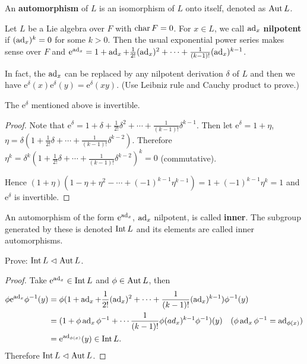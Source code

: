 \begin{definition}
    An \textbf{automorphism} of $L$ is an isomorphism of $L$ onto itself, denoted as $\operatorname{Aut} L$.
\end{definition}

\begin{definition}
    Let $L$ be a Lie algebra over $F$ with $\operatorname{char} F=0$. For $x\in L$, we call $\operatorname{ad}_x$ \textbf{nilpotent} if $(\operatorname{ad}_x)^k=0$ for some $k>0$. Then the usual exponential power series makes sense over $F$ and $\mathrm{e} ^{\operatorname{ad}_x}=1+\operatorname{ad}_x+\frac{1}{2!}(\operatorname{ad}_x)^2+ \cdots+\frac{1}{(k-1)!}(\operatorname{ad}_x)^{k-1}$.
\end{definition}
\begin{remark}
    In fact, the $\operatorname{ad}_x$ can be replaced by any nilpotent derivation $\delta$ of $L$ and then we have $\mathrm{e}^{\delta}(x) \mathrm{e}^{\delta}(y)=\mathrm{e}^{\delta}(xy)$. (Use Leibniz rule and Cauchy product to prove.)
\end{remark}

\begin{proposition}
    The $\mathrm{e}^{\delta}$ mentioned above is invertible.
\end{proposition}
\begin{proof}
    Note that $\mathrm{e}^{\delta}=1+\delta+\frac{1}{2!}\delta^2+ \cdots +\frac{1}{(k-1)!}\delta^{k-1}$. Then let $\mathrm{e}^{\delta}=1+\eta$, $\eta=\delta(1+\frac{1}{2!}\delta+ \cdots +\frac{1}{(k-1)!}\delta^{k-2})$. Therefore $\eta^k=\delta^k (1+\frac{1}{2!}\delta+ \cdots +\frac{1}{(k-1)!}\delta^{k-2})^k=0$ (commutative).

    Hence $(1+\eta)(1-\eta+\eta^2- \cdots +(-1)^{k-1}\eta^{k-1})=1+(-1)^{k-1}\eta^k=1$ and $\mathrm{e}^{\delta}$ is invertible.
\end{proof}

\begin{definition}
    An automorphism of the form $\mathrm{e}^{\operatorname{ad}_x}$, $\operatorname{ad}_x$ nilpotent, is called \textbf{inner}. The subgroup generated by these is denoted $\operatorname{Int} L$ and its elements are called inner automorphisms.
\end{definition}

\begin{proposition}
    Prove: $\operatorname{Int} L \vartriangleleft \operatorname{Aut} L$.
\end{proposition}
\begin{proof}
    Take $\mathrm{e}^{\operatorname{ad}_x} \in \operatorname{Int} L$ and $\phi \in \operatorname{Aut} L$, then 
    \begin{equation*}
        \begin{aligned}
        \phi \mathrm{e}^{\operatorname{ad}_x} \phi^{-1}(y) &= \phi (1+\operatorname{ad}_x+\frac{1}{2!}(\operatorname{ad}_x)^2+ \cdots +\frac{1}{(k-1)!}(\operatorname{ad}_x)^{k-1})\phi^{-1}(y) \\
        &= (1+\phi \operatorname{ad}_x\phi^{-1}+ \cdots  \frac{1}{(k-1)!} \phi (ad_x)^{k-1} \phi^{-1})(y) \quad (\phi \operatorname{ad}_x \phi^{-1}=\operatorname{ad}_{\phi(x)}) \\
        &= \mathrm{e}^{\operatorname{ad}_{\phi(x)}}(y) \in \operatorname{Int} L.
        \end{aligned}
    \end{equation*}
    Therefore $\operatorname{Int} L \vartriangleleft \operatorname{Aut} L$.
\end{proof}

